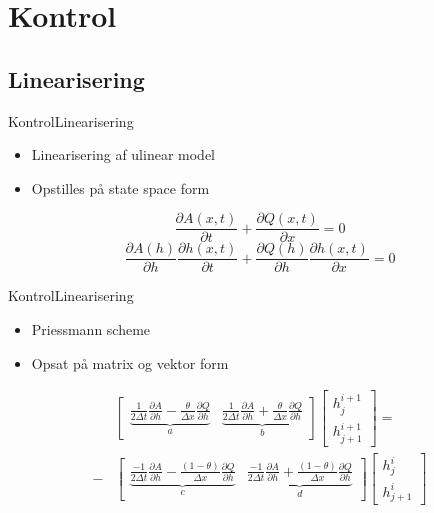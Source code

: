 \section{Kontrol}
\subsection{Linearisering}
\begin{frame}{Kontrol}{Linearisering}
 \vfill\vfill\centering    
\begin{itemize}
	\item Linearisering af ulinear model
	\item Opstilles på state space form

\end{itemize}
\begin{equation}\label{eq:linearization_Continuity}
\frac{\partial A(x,t)}{\partial t} + \frac{\partial Q(x,t)}{\partial x}=0
\end{equation}
\begin{equation}
	\frac{\partial A(h)}{\partial h}\frac{\partial h(x,t)}{\partial t} + \frac{\partial Q(h)}{\partial h}\frac{\partial h(x,t)}{\partial x}=0
\end{equation}
\vfill\vfill
\end{frame}

\begin{frame}{Kontrol}{Linearisering}
 \vfill\vfill\centering    
\begin{itemize}
	\item Priessmann scheme
	\item Opsat på matrix og vektor form

\end{itemize}
\begin{equation}\label{eq:rearrange_continuity_eq}
\begin{aligned}
	&\begin{bmatrix}
		\underbrace{\frac{1}{2\Delta t}\frac{\partial A}{\partial h}-\frac{\theta}{\Delta x}\frac{\partial Q}{\partial h}}_{a} & \underbrace{\frac{1}{2\Delta t}\frac{\partial A}{\partial h}+\frac{\theta}{\Delta x}\frac{\partial Q}{\partial h}}_{b} 
	\end{bmatrix}
	\begin{bmatrix}
		h_{j}^{i+1} \\
		h_{j+1}^{i+1}
	\end{bmatrix}
	= \\ -
	&\begin{bmatrix}
		\underbrace{\frac{-1}{2\Delta t}\frac{\partial A}{\partial h}-\frac{(1-\theta)}{\Delta x}\frac{\partial Q}{\partial h}}_{c} & \underbrace{\frac{-1}{2\Delta t}\frac{\partial A}{\partial h}+\frac{(1-\theta)}{\Delta x}\frac{\partial Q}{\partial h}}_{d} 
	\end{bmatrix}
	\begin{bmatrix}
		h_{j}^{i} \\
		h_{j+1}^{i}
	\end{bmatrix}
	\end{aligned}
\end{equation}
\vfill\vfill
\end{frame}




